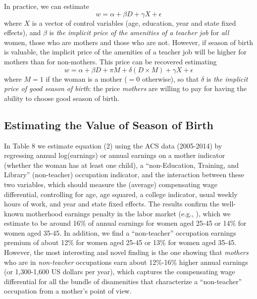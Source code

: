 \documentclass[a4paper, 12 pt]{article}
\theoremstyle{plain}
\begin{document}
\begin{doublespace}
In practice, we can estimate
\begin{equation}
w = \alpha + \beta D +  \gamma X +  \epsilon
\end{equation}
where $X$ is a vector of control variables (age, education, year and state fixed effects), and $\beta$ is \emph{the implicit price of the amenities of a teacher job} for \emph{all} women, those who are mothers and those who are not. However, if season of birth is valuable, the implicit price of the amenities of a teacher job will be higher for mothers than for non-mothers. This price can be recovered estimating
\begin{equation}
w = \alpha + \beta D + \pi M + \delta (D \times M) + \gamma X +  \epsilon
\end{equation}
where $M=1$ if the woman is a mother ($=0$ otherwise), so that $\delta$ is \emph{the implicit price of good season of birth}: the price \emph{mothers} are willing to pay for having the ability to choose good season of birth.


\subsection{Estimating the Value of Season of Birth}
In Table 8 we estimate equation (2) using the ACS data (2005-2014) by regressing annual log(earnings) or annual earnings on a mother indicator (whether the woman has at least one child), a ``non-Education, Training, and Library'' (non-teacher) occupation indicator, and the interaction between these two variables, which should measure the (average) compensating wage differential, controlling for age, age squared, a college indicator, usual weekly hours of work, and year and state fixed effects. The results confirm the well-known motherhood earnings penalty in the labor market (e.g., \citet{Waldfogel98}), which we estimate to be around 16\% of annual earnings for women aged 25-45 or 14\% for women aged 35-45. In addition, we find a ``non-teacher'' occupation earnings premium of about 12\% for women aged 25-45 or 13\% for women aged 35-45. However, the most interesting and novel finding is the one showing that \emph{mothers} who are in \emph{non-teacher} occupations earn about 12\%-16\% higher annual earnings (or 1,300-1,600 US dollars per year), which captures the compensating wage differential for all the bundle of disamenities that characterize a ``non-teacher'' occupation from a mother's point of view.

\newpage


\end{doublespace}
\end{document}

